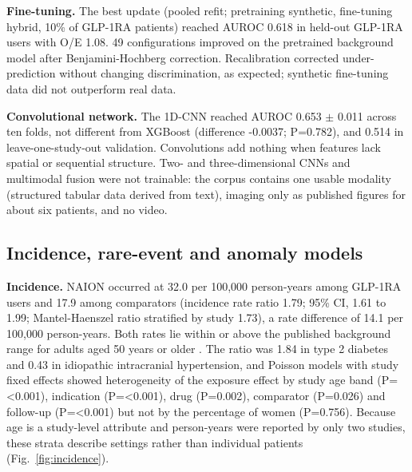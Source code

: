 \documentclass[journal]{IEEEtran}
\begin{document}
\textbf{Fine-tuning.} The best update (pooled refit; pretraining
synthetic, fine-tuning hybrid, 10\% of GLP-1RA patients) reached AUROC
0.618 in held-out GLP-1RA users with O/E 1.08. 49 configurations
improved on the pretrained background model after Benjamini-Hochberg
correction. Recalibration corrected under-prediction without changing
discrimination, as expected; synthetic fine-tuning data did not
outperform real data.

\textbf{Convolutional network.} The 1D-CNN reached AUROC 0.653 \ensuremath{\pm} 0.011
across ten folds, not different from XGBoost (difference -0.0037;
P=0.782), and 0.514 in leave-one-study-out validation. Convolutions add
nothing when features lack spatial or sequential structure. Two- and
three-dimensional CNNs and multimodal fusion were not trainable: the
corpus contains one usable modality (structured tabular data derived
from text), imaging only as published figures for about six patients,
and no video.

\subsection{Incidence, rare-event and anomaly
models}\label{incidence-rare-event-and-anomaly-models}

\textbf{Incidence.} NAION occurred at 32.0 per 100,000 person-years
among GLP-1RA users and 17.9 among comparators (incidence rate ratio
1.79; 95\% CI, 1.61 to 1.99; Mantel-Haenszel ratio stratified by study
1.73), a rate difference of 14.1 per 100,000 person-years. Both rates
lie within or above the published background range for adults aged 50
years or older \cite{p8032479, p9186104}. The ratio was 1.84 in type 2
diabetes and 0.43 in idiopathic intracranial hypertension, and Poisson
models with study fixed effects showed heterogeneity of the exposure
effect by study age band (P=\textless0.001), indication
(P=\textless0.001), drug (P=0.002), comparator (P=0.026) and follow-up
(P=\textless0.001) but not by the percentage of women (P=0.756). Because
age is a study-level attribute and person-years were reported by only
two studies, these strata describe settings rather than individual
patients (Fig.~\ref{fig:incidence}).
\end{document}

